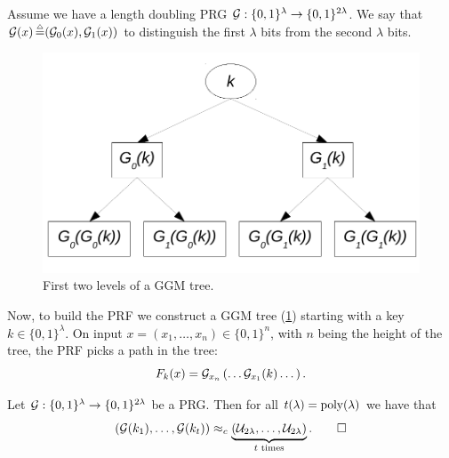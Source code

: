\begin{construction} \label{cons:ggm-tree}
	Assume we have a length doubling \ac{PRG} $\mathcal{G} : \{0,1\}^{\lambda} \to \{0,1\}^{2\lambda}$.
	We say that $\mathcal{G}(x) \mathop{=}\limits^{\scriptscriptstyle \triangle} (\mathcal{G}_0(x), \mathcal{G}_1(x))$ to distinguish the first $\lambda$ bits from the second $\lambda$ bits.

	\begin{figure}
		\centering
		\includegraphics[width=0.8\linewidth]{drawings/ggm-tree.pdf}
		\caption{First two levels of a \acs{GGM} tree. \label{fig:ggm-tree}}
	\end{figure}

	Now, to build the \ac{PRF} we construct a \ac{GGM} tree (\cref{fig:ggm-tree}) starting with a key $k \in \{0,1\}^{\lambda}$.
	On input $x = (x_1, \dots, x_n) \in \{0,1\}^{n}$, with $n$ being the height of the tree, the \ac{PRF} picks a path in the tree:
	\begin{equation*}
		F_k(x) = \mathcal{G}_{x_n} \left( \dots \mathcal{G}_{x_1}(k) \dots \right).
	\end{equation*}
\end{construction}

\begin{lemma} \label{lem:prg-poly-times}
	Let $\mathcal{G} : \{0,1\}^{\lambda} \to \{0,1\}^{2\lambda}$ be a \ac{PRG}.
	Then for all $t(\lambda) = \mathrm{poly}(\lambda)$ we have that
	\begin{equation*}
		\left( \mathcal{G}(k_1), \dots, \mathcal{G}(k_t) \right)
		\approx_c
		\underbrace{\left( \mathcal{U}_{2\lambda}, \dots, \mathcal{U}_{2\lambda} \right)}_{t \text{ times}}. \qedhere
	\end{equation*}
\end{lemma}

